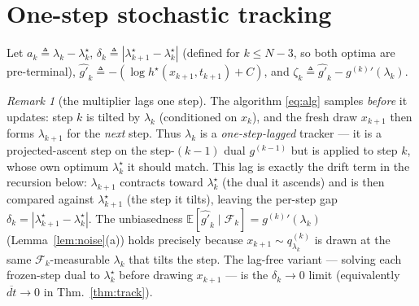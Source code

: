 \documentclass[11pt]{article}
\newcommand{\E}{\mathbb{E}}
\newcommand{\F}{\mathcal{F}}
\newcommand{\hs}{h^\star}
\theoremstyle{plain}
\theoremstyle{definition}
\theoremstyle{remark}
\newtheorem{remark}{Remark}
\begin{document}
\section{One-step stochastic tracking}
\label{sec:track}

Let $a_k\triangleq\lambda_k-\lambda^\star_k$, $\delta_k\triangleq|\lambda^\star_{k+1}-\lambda^\star_k|$
(defined for $k\le N-3$, so both optima are pre-terminal),
$\widehat{g'}_k\triangleq-(\log\hs(x_{k+1},t_{k+1})+C)$, and $\zeta_k\triangleq\widehat{g'}_k-g^{(k)}{}'(\lambda_k)$.

\begin{remark}[the multiplier lags one step]
\label{rem:lag}
The algorithm \eqref{eq:alg} samples \emph{before} it updates: step $k$ is tilted by $\lambda_k$
(conditioned on $x_k$), and the fresh draw $x_{k+1}$ then forms $\lambda_{k+1}$ for the \emph{next}
step. Thus $\lambda_k$ is a \emph{one-step-lagged} tracker --- it is a projected-ascent step on
the step-$(k{-}1)$ dual $g^{(k-1)}$ but is applied to step $k$, whose own optimum $\lambda^\star_k$
it should match. This lag is exactly the drift term in the recursion below: $\lambda_{k+1}$
contracts toward $\lambda^\star_k$ (the dual it ascends) and is then compared against
$\lambda^\star_{k+1}$ (the step it tilts), leaving the per-step gap
$\delta_k=|\lambda^\star_{k+1}-\lambda^\star_k|$. The unbiasedness
$\E[\widehat{g'}_k\mid\F_k]=g^{(k)}{}'(\lambda_k)$ (Lemma~\ref{lem:noise}(a)) holds precisely
because $x_{k+1}\sim q^{(k)}_{\lambda_k}$ is drawn at the same $\F_k$-measurable $\lambda_k$ that
tilts the step. The lag-free variant --- solving each frozen-step dual to $\lambda^\star_k$ before
drawing $x_{k+1}$ --- is the $\delta_k\to0$ limit (equivalently $\overline{dt}\to0$ in Thm.~\ref{thm:track}).
\end{remark}
\end{document}
